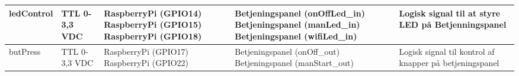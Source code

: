 \begin{center}
\begin{longtable}{|p{}|p{}|p{}|p{}|p{3cm}|}
ledControl
&TTL 0-3,3 VDC		
&RaspberryPi \newline (GPIO14) \newline
 RaspberryPi \newline (GPIO15) \newline
 RaspberryPi \newline (GPIO18)
&Betjeningspanel \newline (onOffLed\_in) \newline
 Betjeningspanel \newline (manLed\_in) \newline
 Betjeningspanel \newline (wifiLed\_in)
&Logisk signal til at styre LED på Betjenningspanel
\\\hline

butPress
&TTL 0-3,3 VDC		
&RaspberryPi \newline (GPIO17) \newline
 RaspberryPi \newline (GPIO22)
&Betjeningspanel \newline (onOff\_out) \newline
 Betjeningspanel \newline (manStart\_out)
&Logisk signal til kontrol af knapper på betjeningspanel
\\\hline

\end{longtable}
\end{center}